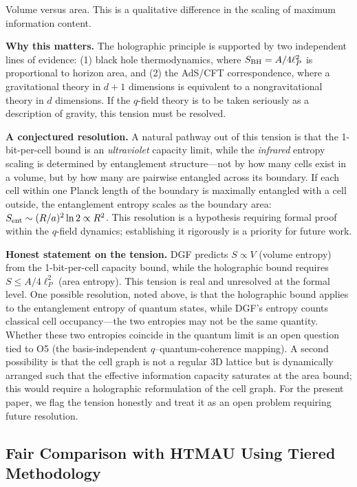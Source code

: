 \documentclass[aps,prd,twocolumn,showpacs,superscriptaddress,preprintnumbers]{revtex4-2}
\begin{document}
Volume versus area. This is a qualitative difference in the scaling of maximum information content.

\textbf{Why this matters.}
The holographic principle is supported by two independent lines of evidence:
(1) black hole thermodynamics, where $S_{\rm BH}=A/4\ell_P^2$ is proportional to horizon area, and
(2) the AdS/CFT correspondence, where a gravitational theory in $d+1$ dimensions is equivalent to a nongravitational theory in $d$ dimensions.
If the $q$-field theory is to be taken seriously as a description of gravity, this tension must be resolved.

\textbf{A conjectured resolution.}
A natural pathway out of this tension is that the 1-bit-per-cell bound is an \emph{ultraviolet} capacity limit, while the \emph{infrared} entropy scaling is determined by entanglement structure---not by how many cells exist in a volume, but by how many are pairwise entangled across its boundary.
If each cell within one Planck length of the boundary is maximally entangled with a cell outside, the entanglement entropy scales as the boundary area: $S_{\rm ent}\sim(R/a)^2\ln 2\propto R^2$.
This resolution is a hypothesis requiring formal proof within the $q$-field dynamics; establishing it rigorously is a priority for future work.

\textbf{Honest statement on the tension.}
DGF predicts $S \propto V$ (volume entropy) from the 1-bit-per-cell capacity bound, while the holographic bound requires $S \leq A/4\ell_P^2$ (area entropy).
This tension is real and unresolved at the formal level.
One possible resolution, noted above, is that the holographic bound applies to the entanglement entropy of quantum states, while DGF's entropy counts classical cell occupancy---the two entropies may not be the same quantity.
Whether these two entropies coincide in the quantum limit is an open question tied to O5 (the basis-independent $q$--quantum-coherence mapping).
A second possibility is that the cell graph is not a regular 3D lattice but is dynamically arranged such that the effective information capacity saturates at the area bound; this would require a holographic reformulation of the cell graph.
For the present paper, we flag the tension honestly and treat it as an open problem requiring future resolution.

\subsection{Fair Comparison with HTMAU Using Tiered Methodology}
\label{sec:htmau_comparison}
\end{document}
